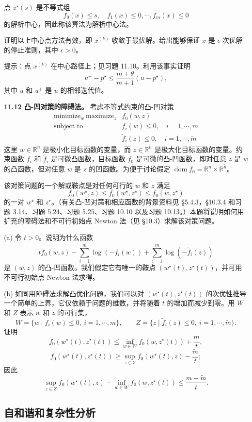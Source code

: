 \documentclass[UTF8,12pt,a4paper,fontset=fandol]{ctexart}
\begin{document}
点 $z^\star(s)$ 是不等式组
\[
f_0(x)\leq s,\quad f_1(x)\leq 0,\cdots,f_m(x)\leq 0
\]
的解析中心，因此称该算法为解析中心法。

证明以上中心点方法有效，即 $x^{(k)}$ 收敛于最优解。给出能够保证 $x$ 是 $\epsilon$-次优解的停止准则，其中 $\epsilon>0$。

提示：点 $x^{(k)}$ 在中心路径上；见习题 11.10。利用该事实证明
\[
u^+-p^\star\leq \frac{m+\theta}{m+1}(u-p^\star),
\]
其中 $u$ 和 $u^+$ 是 $u$ 的相邻迭代值。

\noindent\textbf{11.12 凸-凹对策的障碍法。} 考虑不等式约束的凸-凹对策
\[
\begin{array}{ll}
\text{minimize}_w\ \text{maximize}_z & f_0(w,z)\\
\text{subject to} & f_i(w)\leq 0,\quad i=1,\cdots,m\\
& \tilde f_i(z)\leq 0,\quad i=1,\cdots,\tilde m
\end{array}
\]
这里 $w\in\mathbb{R}^n$ 是极小化目标函数的变量，而 $z\in\mathbb{R}^{\tilde n}$ 是极大化目标函数的变量。约束函数 $f_i$ 和 $\tilde f_i$ 是可微凸函数，目标函数 $f_0$ 是可微的凸-凹函数，即对任意 $z$ 是 $w$ 的凸函数，但对任意 $w$ 是 $z$ 的凹函数。为便于讨论假定 $\operatorname{dom} f_0=\mathbb{R}^n\times\mathbb{R}^{\tilde n}$。

该对策问题的一个解或鞍点是对任何可行的 $w$ 和 $z$ 满足
\[
f_0(w^\star,z)\leq f_0(w^\star,z^\star)\leq f_0(w,z^\star)
\]
的一对 $w^\star$ 和 $z^\star$。（有关凸-凹对策和相应函数的背景资料见 \S5.4.3，\S10.3.4 和习题 3.14、习题 5.24、习题 5.25、习题 10.10 以及习题 10.13。）本题将说明如何用扩充的障碍法和不可行初始点 Newton 法（见 \S10.3）求解该对策问题。

(a) 令 $t>0$。说明为什么函数
\[
tf_0(w,z)-\sum_{i=1}^m\log(-f_i(w))+\sum_{i=1}^{\tilde m}\log(-\tilde f_i(z))
\]
是 $(w,z)$ 的凸-凹函数。我们假定它有唯一的鞍点 $(w^\star(t),z^\star(t))$，并可用不可行初始点 Newton 法求得。

(b) 如同用障碍法求解凸优化问题，我们可以对 $(w^\star(t),z^\star(t))$ 的次优性推导一个简单的上界，它仅依赖于问题的维数，并将随着 $t$ 的增加而减少到零。用 $W$ 和 $Z$ 表示 $w$ 和 $z$ 的可行集，
\[
W=\{w\mid f_i(w)\leq 0,\ i=1,\cdots,m\},\qquad
Z=\{z\mid \tilde f_i(z)\leq 0,\ i=1,\cdots,\tilde m\}.
\]
证明
\[
f_0(w^\star(t),z^\star(t))\leq \inf_{w\in W} f_0(w,z^\star(t))+\frac{m}{t},
\]
\[
f_0(w^\star(t),z^\star(t))\geq \sup_{z\in Z} f_0(w^\star(t),z)-\frac{\tilde m}{t};
\]
因此
\[
\sup_{z\in Z} f_0(w^\star(t),z)-\inf_{w\in W} f_0(w,z^\star(t))\leq \frac{m+\tilde m}{t}.
\]

\subsection*{自和谐和复杂性分析}
\end{document}
